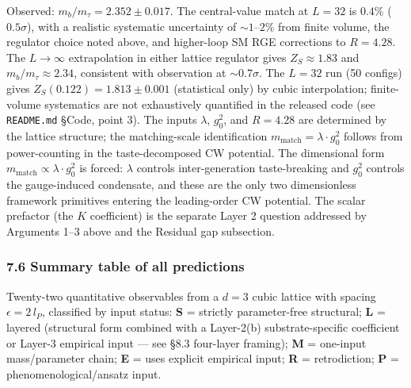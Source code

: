 \documentclass[
]{article}
\begin{document}
Observed: \(m_b/m_\tau = 2.352 \pm 0.017\). The central-value match at
\(L=32\) is \(0.4\%\) (\(0.5\sigma\)), with a realistic systematic
uncertainty of \(\sim 1\)--\(2\%\) from finite volume, the regulator
choice noted above, and higher-loop SM RGE corrections to \(R = 4.28\).
The \(L \to \infty\) extrapolation in either lattice regulator gives
\(Z_S \approx 1.83\) and \(m_b/m_\tau \approx 2.34\), consistent with
observation at \(\sim 0.7\sigma\). The \(L = 32\) run (50 configs) gives
\(Z_S(0.122) = 1.813 \pm 0.001\) (statistical only) by cubic
interpolation; finite-volume systematics are not exhaustively quantified
in the released code (see \texttt{README.md} §Code, point 3). The inputs
\(\lambda\), \(g_0^2\), and \(R = 4.28\) are determined by the lattice
structure; the matching-scale identification
\(m_{\text{match}} = \lambda \cdot g_0^2\) follows from power-counting
in the taste-decomposed CW potential. The dimensional form
\(m_{\text{match}} \propto \lambda \cdot g_0^2\) is forced: \(\lambda\)
controls inter-generation taste-breaking and \(g_0^2\) controls the
gauge-induced condensate, and these are the only two dimensionless
framework primitives entering the leading-order CW potential. The scalar
prefactor (the \(K\) coefficient) is the separate Layer 2 question
addressed by Arguments 1--3 above and the Residual gap subsection.

\hypertarget{summary-table-of-all-predictions}{%
\subsubsection{7.6 Summary table of all
predictions}\label{summary-table-of-all-predictions}}

Twenty-two quantitative observables from a \(d = 3\) cubic lattice with
spacing \(\epsilon = 2\,l_P\), classified by input status: \textbf{S} =
strictly parameter-free structural; \textbf{L} = layered (structural
form combined with a Layer-2(b) substrate-specific coefficient or
Layer-3 empirical input --- see §8.3 four-layer framing); \textbf{M} =
one-input mass/parameter chain; \textbf{E} = uses explicit empirical
input; \textbf{R} = retrodiction; \textbf{P} = phenomenological/ansatz
input.
\end{document}
